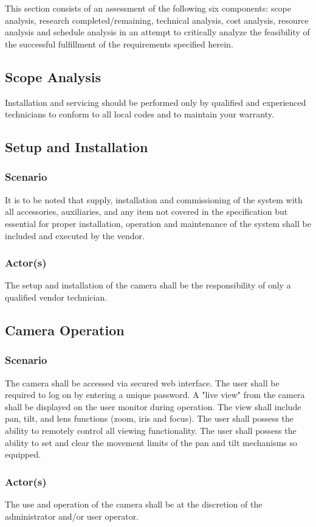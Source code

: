 This section consists of an assessment of the following six components: scope analysis, research completed/remaining, technical analysis, cost analysis, resource analysis and schedule analysis in an attempt to critically analyze the feasibility of the successful fulfillment of the requirements specified herein.
\subsection{Scope Analysis}
Installation and servicing should be performed only by qualified and experienced technicians to conform to all local codes and to maintain your warranty.
\subsection{Setup and Installation}
\subsubsection{Scenario}
It is to be noted that supply, installation and commissioning of the system with all accessories, auxiliaries, and any item not covered in the specification but essential for proper installation, operation and maintenance of the system shall be included and executed by the vendor.
\subsubsection{Actor(s)}
The setup and installation of the camera shall be the responsibility of only a qualified vendor technician.
\subsection{Camera Operation}
\subsubsection{Scenario}
The camera shall be accessed via secured web interface.
The user shall be required to log on by entering a unique password.
A "live view" from the camera shall be displayed on the user monitor during operation. 
The view shall include pan, tilt, and lens functions (zoom, iris and focus). 
The user shall possess the ability to remotely control all viewing functionality.
The user shall possess the ability to set and clear the movement limits of the pan and tilt mechanisms so equipped.
\subsubsection{Actor(s)}
The use and operation of the camera shall be at the discretion of the administrator and/or user operator.
